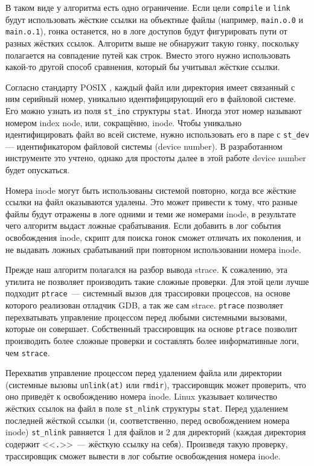 В таком виде у алгоритма есть одно ограничение. Если цели \texttt{compile} и \texttt{link} будут использовать жёсткие ссылки на объектные файлы (например, \texttt{main.o.0} и \texttt{main.o.1}), гонка останется, но в логе доступов будут фигурировать пути от разных жёстких ссылок. Алгоритм выше не обнаружит такую гонку, поскольку полагается на совпадение путей как строк. Вместо этого нужно использовать какой-то другой способ сравнения, который бы учитывал жёсткие ссылки.

Согласно стандарту POSIX \cite{1999standard}, каждый файл или директория имеет связанный с ним серийный номер, уникально идентифицирующий его в файловой системе. Его можно узнать из поля \texttt{st\_ino} структуры \texttt{stat}. Иногда этот номер называют номером index node, или, сокращённо, inode. Чтобы уникально идентифицировать файл во всей системе, нужно использовать его в паре с \texttt{st\_dev} --- идентификатором файловой системы (device number). В разработанном инструменте это учтено, однако для простоты далее в этой работе device number будет опускаться.

Номера inode могут быть использованы системой повторно, когда все жёсткие ссылки на файл оказываются удалены. Это может привести к тому, что разные файлы будут отражены в логе одними и теми же номерами inode, в результате чего алгоритм выдаст ложные срабатывания. Если добавить в лог события освобождения inode, скрипт для поиска гонок сможет отличать их поколения, и не выдавать ложных срабатываний при повторном использовании номера inode.

Прежде наш алгоритм полагался на разбор вывода strace. К сожалению, эта утилита не позволяет производить такие сложные проверки. Для этой цели лучше подходит \texttt{ptrace}~--- системный вызов для трассировки процессов, на основе которого реализован отладчик GDB, а так же сам strace. \texttt{ptrace} позволяет перехватывать управление процессом перед любыми системными вызовами, которые он совершает. Собственный трассировщик на основе \texttt{ptrace} позволит производить более сложные проверки и составлять более информативные логи, чем \texttt{strace}.

Перехватив управление процессом перед удалением файла или директории (системные вызовы \texttt{unlink(at)} или \texttt{rmdir}), трассировщик может проверить, что оно приведёт к освобождению номера inode. Linux указывает количество жёстких ссылок на файл в поле \texttt{st\_nlink} структуры \texttt{stat}. Перед удалением последней жёсткой ссылки (и, соответственно, перед освобождением номера inode) \texttt{st\_nlink} равняется 1 для файлов и 2 для директорий (каждая директория содержит <<\texttt{.}>>~--- жёсткую ссылку на себя). Произведя такую проверку, трассировщик сможет вывести в лог событие освобождения номера inode.


